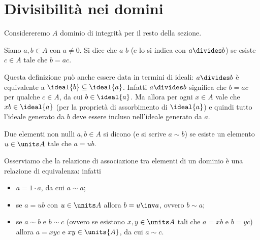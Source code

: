 \section{Divisibilità nei domini}

Considereremo $A$ dominio di integrità per il resto della sezione.

\begin{definition}
    Siano $a, b \in A$ con $a \neq 0$. Si dice che $a$  $b$ (e lo si indica con $a \divides b$) se esiste $c \in A$ tale che $b = ac$.
\end{definition}

Questa definizione può anche essere data in termini di ideali: $a \divides b$ è equivalente a $\ideal{b} \subseteq \ideal{a}$. Infatti $a \divides b$ significa che $b = ac$ per qualche $c \in A$, da cui $b \in \ideal{a}$. Ma allora per ogni $x \in A$ vale che $xb \in \ideal{a}$ (per la proprietà di assorbimento di $\ideal{a}$) e quindi tutto l'ideale generato da $b$ deve essere incluso nell'ideale generato da $a$.

\begin{definition}
    Due elementi non nulli $a, b \in A$ si dicono  (e si scrive $a \sim b$) se esiste un elemento $u \in \units A$ tale che $a = ub$.
\end{definition}

Osserviamo che la relazione di associazione tra elementi di un dominio è una relazione di equivalenza: infatti 
\begin{itemize}
    \item $a = 1 \cdot a$, da cui $a \sim a$;
    \item se $a = ub$ con $u \in \units A$ allora $b = u\inv a$, ovvero $b \sim a$;
    \item se $a \sim b$ e $b \sim c$ (ovvero se esistono $x, y \in \units A$ tali che $a = xb$ e $b = yc$) allora $a = xyc$ e $xy \in \units{A}$, da cui $a \sim c$.
\end{itemize}

